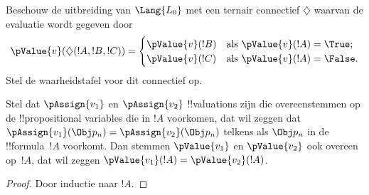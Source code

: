 \documentclass[../../../include/open-logic-section]{subfiles}
\begin{document}
\begin{prob}
Beschouw de uitbreiding van $\Lang{L_0}$ met een ternair connectief
$\diamondsuit$ waarvan de evaluatie wordt gegeven door
\begin{gather*}
  \pValue{v}(\diamondsuit( !A , !B , !C ) ) = \begin{cases}
    \pValue{v}( !B ) &
    \text{als $\pValue{v}(!A) = \True$;}\\
    \pValue{v}( !C ) &
    \text{als $\pValue{v}(!A) = \False $}.
  \end{cases}
\end{gather*}
Stel de waarheidstafel voor dit connectief op.
\end{prob}

\begin{thm}
 Stel dat $\pAssign{v_1}$ en
$\pAssign{v_2}$ !!{valuation}s zijn die overeenstemmen op de
!!{propositional variable}s die in $!A$ voorkomen, dat wil zeggen dat
$\pAssign{v_1}(\Obj p_n) = \pAssign{v_2}(\Obj p_n)$ telkens als
$\Obj p_n$ in de !!{formula}~$!A$ voorkomt. Dan stemmen
$\pValue{v_1}$ en $\pValue{v_2}$ ook overeen op~$!A$, dat wil zeggen
$\pValue{v_1}(!A) = \pValue{v_2}(!A)$.
\end{thm}

\begin{proof}
Door inductie naar $!A$.
\end{proof}
\end{document}
